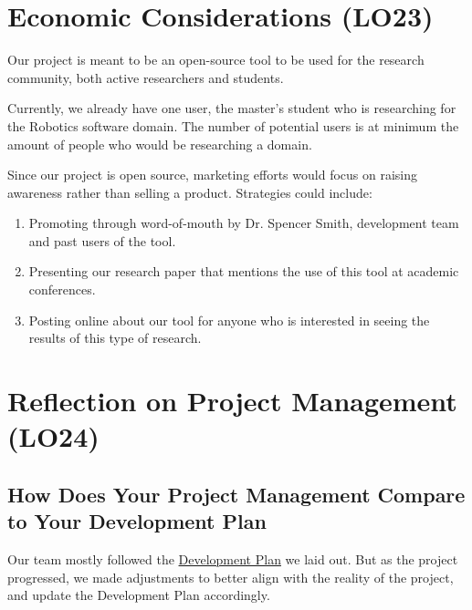 \documentclass{article}
\begin{document}
\section{Economic Considerations (LO23)}

Our project is meant to be an open-source tool to be used for the research community, both active researchers and students.

Currently, we already have one user, the master's student who is researching for the Robotics software domain.
The number of potential users is at minimum the amount of people who would be researching a domain.

Since our project is open source, marketing efforts would focus on raising awareness rather than selling a product. Strategies could include:
\begin{enumerate}
    \item Promoting through word-of-mouth by Dr. Spencer Smith, development team and past users of the tool.
    \item Presenting our research paper that mentions the use of this tool at academic conferences.
    \item Posting online about our tool for anyone who is interested in seeing the results of this type of research.
\end{enumerate}

\section{Reflection on Project Management (LO24)}

\subsection{How Does Your Project Management Compare to Your Development Plan}

Our team mostly followed the \href{https://github.com/thaafei/DomainX/blob/main/docs/DevelopmentPlan/DevelopmentPlan.pdf}{Development Plan} we laid out. But as the project progressed, we made adjustments to better align with the reality of the project, and update the Development Plan accordingly.
\end{document}
